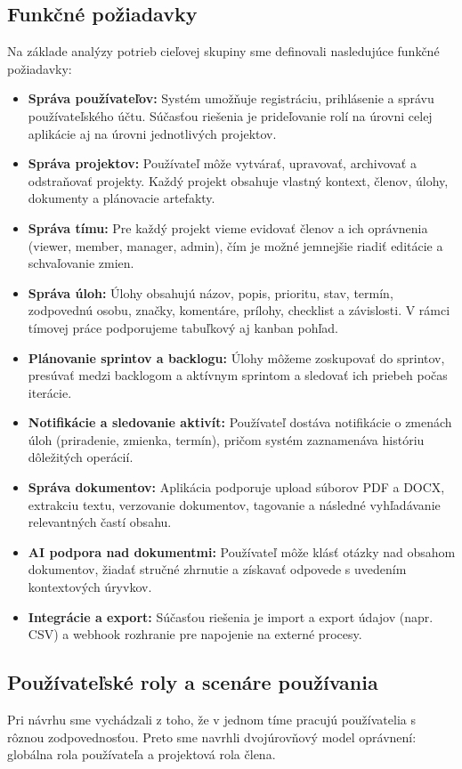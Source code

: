 \documentclass[12pt, a4paper]{article}
\begin{document}
\begin{titlepage}
\subsection{Funkčné požiadavky}
Na základe analýzy potrieb cieľovej skupiny sme definovali nasledujúce funkčné požiadavky:
\begin{itemize}
    \item \textbf{Správa používateľov:} Systém umožňuje registráciu, prihlásenie a správu používateľského účtu. Súčasťou riešenia je prideľovanie rolí na úrovni celej aplikácie aj na úrovni jednotlivých projektov.
    \item \textbf{Správa projektov:} Používateľ môže vytvárať, upravovať, archivovať a odstraňovať projekty. Každý projekt obsahuje vlastný kontext, členov, úlohy, dokumenty a plánovacie artefakty.
    \item \textbf{Správa tímu:} Pre každý projekt vieme evidovať členov a ich oprávnenia (viewer, member, manager, admin), čím je možné jemnejšie riadiť editácie a schvaľovanie zmien.
    \item \textbf{Správa úloh:} Úlohy obsahujú názov, popis, prioritu, stav, termín, zodpovednú osobu, značky, komentáre, prílohy, checklist a závislosti. V rámci tímovej práce podporujeme tabuľkový aj kanban pohľad.
    \item \textbf{Plánovanie sprintov a backlogu:} Úlohy môžeme zoskupovať do sprintov, presúvať medzi backlogom a aktívnym sprintom a sledovať ich priebeh počas iterácie.
    \item \textbf{Notifikácie a sledovanie aktivít:} Používateľ dostáva notifikácie o zmenách úloh (priradenie, zmienka, termín), pričom systém zaznamenáva históriu dôležitých operácií.
    \item \textbf{Správa dokumentov:} Aplikácia podporuje upload súborov PDF a DOCX, extrakciu textu, verzovanie dokumentov, tagovanie a následné vyhľadávanie relevantných častí obsahu.
    \item \textbf{AI podpora nad dokumentmi:} Používateľ môže klásť otázky nad obsahom dokumentov, žiadať stručné zhrnutie a získavať odpovede s uvedením kontextových úryvkov.
    \item \textbf{Integrácie a export:} Súčasťou riešenia je import a export údajov (napr. CSV) a webhook rozhranie pre napojenie na externé procesy.
\end{itemize}

\subsection{Používateľské roly a scenáre používania}
Pri návrhu sme vychádzali z toho, že v jednom tíme pracujú používatelia s rôznou zodpovednosťou. Preto sme navrhli dvojúrovňový model oprávnení: globálna rola používateľa a projektová rola člena.


\end{titlepage}
\end{document}
